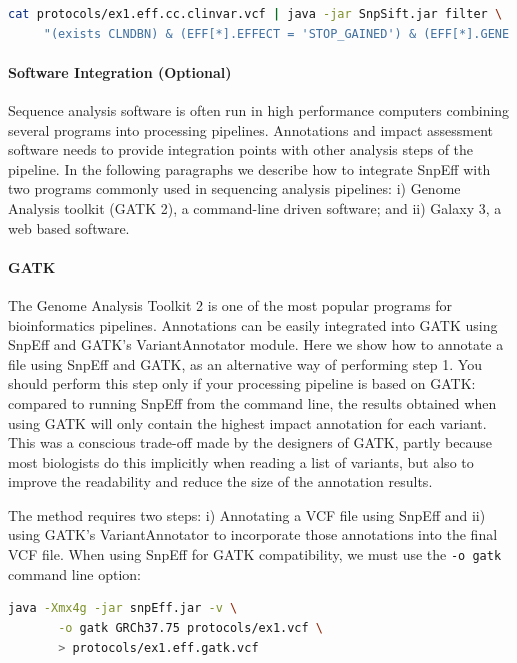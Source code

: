 \begin{lstlisting}[language=bash]
cat protocols/ex1.eff.cc.clinvar.vcf | java -jar SnpSift.jar filter \
     "(exists CLNDBN) & (EFF[*].EFFECT = 'STOP_GAINED') & (EFF[*].GENE = 'CF TR')"
\end{lstlisting}

\paragraph{Software Integration (Optional)} Sequence analysis software is often run in high performance computers combining several programs into processing pipelines. Annotations and impact assessment software needs to provide integration points with other analysis steps of the pipeline. In the following paragraphs we describe how to integrate SnpEff with two programs commonly used in sequencing analysis pipelines: i) Genome Analysis toolkit (GATK 2), a command-line driven software; and ii) Galaxy 3, a web based software.

\paragraph{GATK} The Genome Analysis Toolkit 2 is one of the most popular programs for bioinformatics pipelines. Annotations can be easily integrated into GATK using SnpEff and GATK’s VariantAnnotator module. Here we show how to annotate a file using SnpEff and GATK, as an alternative way of performing step 1. You should perform this step only if your processing pipeline is based on GATK: compared to running SnpEff from the command line, the results obtained when using GATK will only contain the highest impact annotation for each variant. This was a conscious trade-off made by the designers of GATK, partly because most biologists do this implicitly when reading a list of variants, but also to improve the readability and reduce the size of the annotation results.

The method requires two steps: i) Annotating a VCF file using SnpEff and ii) using GATK’s VariantAnnotator to incorporate those annotations into the final VCF file. When using SnpEff for GATK compatibility, we must use the \texttt{-o gatk} command line option:

\begin{lstlisting}[language=bash]
java -Xmx4g -jar snpEff.jar -v \
       -o gatk GRCh37.75 protocols/ex1.vcf \
       > protocols/ex1.eff.gatk.vcf
\end{lstlisting}

